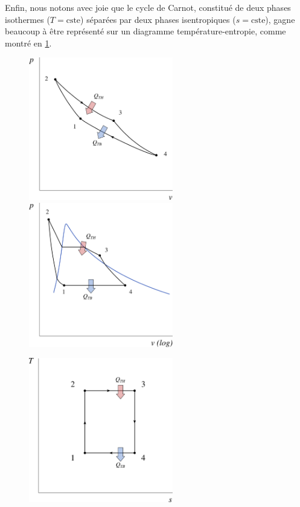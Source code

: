 		\onlyamphibook{\clearfloats}
		Enfin, nous notons avec joie que le cycle de Carnot, constitué de deux phases isothermes ($T = \text{cste}$) séparées par deux phases isentropiques ($s = \text{cste}$), gagne beaucoup à être représenté sur un diagramme température-entropie, comme montré en \cref{fig_ts_carnot}.

		\begin{figure}[htb]%
			\begin{center}
				\includegraphics[width=6.3cm]{images/pv_carnot_gp.png}
				\includegraphics[width=6.3cm]{images/pv_carnot_lv.png}
				\vspace{0.5cm}
				
				\includegraphics[width=6.3cm]{images/ts_carnot.png}
			\end{center}
			\label{fig_ts_carnot}
		\end{figure}


